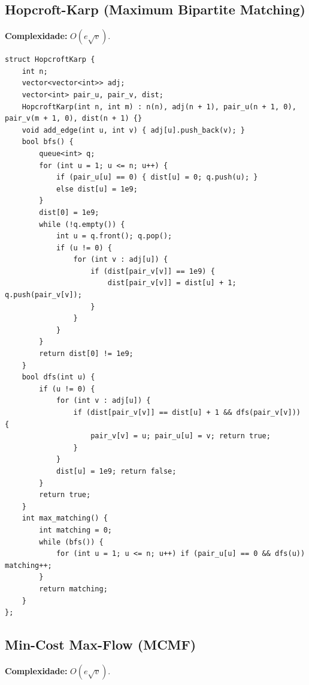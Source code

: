 \subsection{Hopcroft-Karp (Maximum Bipartite Matching)}

\textbf{Complexidade:} $O(e \sqrt{v})$.

\begin{lstlisting}
struct HopcroftKarp {
    int n;
    vector<vector<int>> adj;
    vector<int> pair_u, pair_v, dist;
    HopcroftKarp(int n, int m) : n(n), adj(n + 1), pair_u(n + 1, 0), pair_v(m + 1, 0), dist(n + 1) {}
    void add_edge(int u, int v) { adj[u].push_back(v); }
    bool bfs() {
        queue<int> q;
        for (int u = 1; u <= n; u++) {
            if (pair_u[u] == 0) { dist[u] = 0; q.push(u); }
            else dist[u] = 1e9;
        }
        dist[0] = 1e9;
        while (!q.empty()) {
            int u = q.front(); q.pop();
            if (u != 0) {
                for (int v : adj[u]) {
                    if (dist[pair_v[v]] == 1e9) {
                        dist[pair_v[v]] = dist[u] + 1; q.push(pair_v[v]);
                    }
                }
            }
        }
        return dist[0] != 1e9;
    }
    bool dfs(int u) {
        if (u != 0) {
            for (int v : adj[u]) {
                if (dist[pair_v[v]] == dist[u] + 1 && dfs(pair_v[v])) {
                    pair_v[v] = u; pair_u[u] = v; return true;
                }
            }
            dist[u] = 1e9; return false;
        }
        return true;
    }
    int max_matching() {
        int matching = 0;
        while (bfs()) {
            for (int u = 1; u <= n; u++) if (pair_u[u] == 0 && dfs(u)) matching++;
        }
        return matching;
    }
};
\end{lstlisting}


\subsection{Min-Cost Max-Flow (MCMF)}

\textbf{Complexidade:} $O(e \sqrt{v})$.

